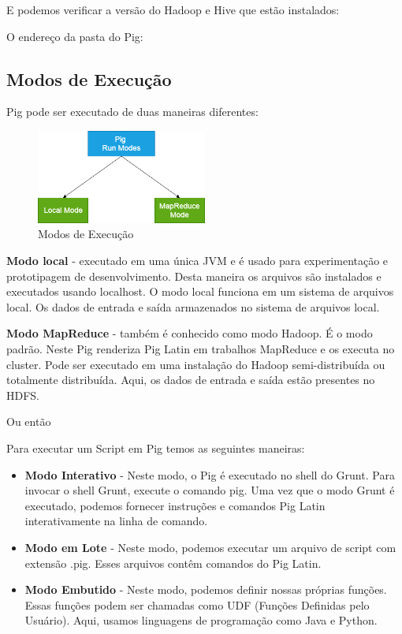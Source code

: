 \documentclass[a4paper,11pt]{article}
\begin{document}


E podemos verificar a versão do Hadoop e Hive que estão instalados: \\

O endereço da pasta do Pig: \\

\subsection{Modos de Execução}
Pig pode ser executado de duas maneiras diferentes:
\begin{figure}[H]
	\centering
	\includegraphics[width=0.5\textwidth]{imagem/modos}
	\caption{Modos de Execução}
\end{figure}

\textbf{Modo local} - executado em uma única JVM e é usado para experimentação e prototipagem de desenvolvimento. Desta maneira os arquivos são instalados e executados usando localhost. O modo local funciona em um sistema de arquivos local. Os dados de entrada e saída armazenados no sistema de arquivos local. \\

\textbf{Modo MapReduce} - também é conhecido como modo Hadoop. É o modo padrão. Neste Pig renderiza Pig Latin em trabalhos MapReduce e os executa no cluster. Pode ser executado em uma instalação do Hadoop semi-distribuída ou totalmente distribuída. Aqui, os dados de entrada e saída estão presentes no HDFS. \\

Ou então \\

Para executar um Script em Pig temos as seguintes maneiras: \vspace{-1em}
\begin{itemize}
	\item \textbf{Modo Interativo} - Neste modo, o Pig é executado no shell do Grunt. Para invocar o shell Grunt, execute o comando pig. Uma vez que o modo Grunt é executado, podemos fornecer instruções e comandos Pig Latin interativamente na linha de comando.
	\item \textbf{Modo em Lote} - Neste modo, podemos executar um arquivo de script com extensão .pig. Esses arquivos contêm comandos do Pig Latin.
	\item \textbf{Modo Embutido} - Neste modo, podemos definir nossas próprias funções. Essas funções podem ser chamadas como UDF (Funções Definidas pelo Usuário). Aqui, usamos linguagens de programação como Java e Python.
\end{itemize}
\end{document}

